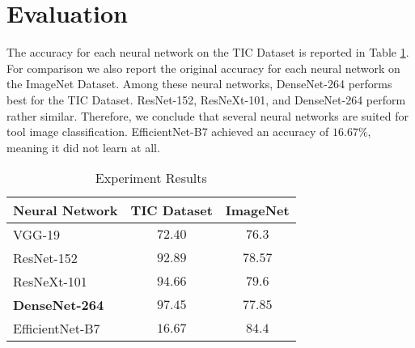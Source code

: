 \documentclass[a4paper, 10pt, journal]{wissarbIEEE}
\begin{document}
\section{Evaluation}
\label{sec:eval}
The accuracy for each neural network on the TIC Dataset is reported in Table \ref{tab:acc}. For comparison we also report the original accuracy for each  neural network on the ImageNet Dataset.
Among these neural networks, DenseNet-264 performs best for the {TIC Dataset}. ResNet-152, ResNeXt-101, and DenseNet-264 perform rather similar. Therefore, we conclude that several neural networks are suited for tool image classification.  
EfficientNet-B7 achieved an accuracy of $16.67\%$, meaning it did not learn at all.
\begin{table}[h]
\caption{Experiment Results} \label{tab:acc}
	\begin{tabularx}{0.48\textwidth}{Xcc}
		\toprule 
		\textbf{Neural Network} & \textbf{TIC Dataset} & \textbf{ImageNet} \\\midrule
		VGG-19 & $72.40$ & $76.3$ \cite{Simonyan.2014}\\
		ResNet-152 & $92.89$ & $78.57$ \cite{He.2016}\\
		ResNeXt-101 & $94.66$ & $79.6$\cite{Xie.2017} \\
		\textbf{DenseNet-264} & $\mathbf{97.45}$ & $77.85$ \cite{Huang.2017}\\
		EfficientNet-B7 & $16.67$ & $84.4$ \cite{Tan.2019}\\
		\bottomrule
	\end{tabularx}
\end{table}
\end{document}
